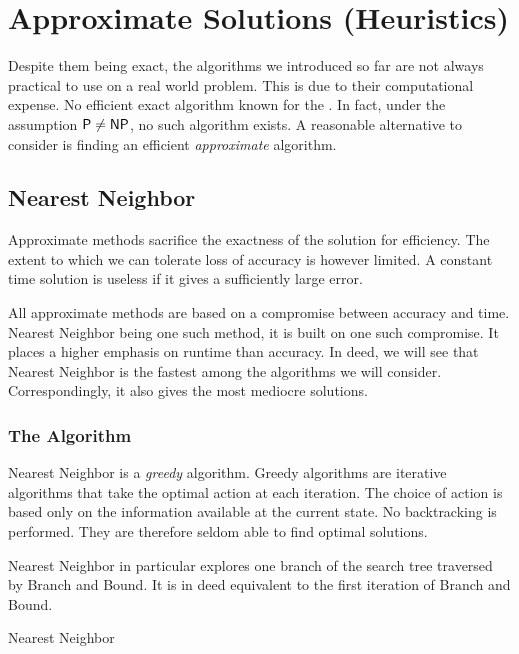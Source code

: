 \chapter{Approximate Solutions (Heuristics)}

Despite them being exact, the algorithms we introduced so far are not always practical to use on a real world problem. This is due to their computational expense. No efficient exact algorithm known for the \TSP. In fact, under the assumption \(\textsf{P}\neq\textsf{NP}\), no such algorithm exists. A reasonable alternative to consider is finding an efficient \emph{approximate} algorithm.

\section{Nearest Neighbor}

    Approximate methods sacrifice the exactness of the solution for efficiency. The extent to which we can tolerate loss of accuracy is however limited. A constant time solution is useless if it gives a sufficiently large error. 
    
    All approximate methods are based on a compromise between accuracy and time. Nearest Neighbor being one such method, it is built on one such compromise. It places a higher emphasis on runtime than accuracy. In deed, we will see that Nearest Neighbor is the fastest among the algorithms we will consider. Correspondingly, it also gives the most mediocre solutions.

    \subsection{The Algorithm}

    Nearest Neighbor is a \emph{greedy} algorithm. Greedy algorithms are iterative algorithms that take the optimal action at each iteration. The choice of action is based only on the information available at the current state. No backtracking is performed. They are therefore seldom able to find optimal solutions.

    Nearest Neighbor in particular explores one branch of the search tree traversed by Branch and Bound. It is in deed equivalent to the first iteration of Branch and Bound. 

    \begin{algorithm}
        \caption{Nearest Neighbor}
        \label{algo:nearest-neighbor}
            \DontPrintSemicolon
             
    \end{algorithm}

